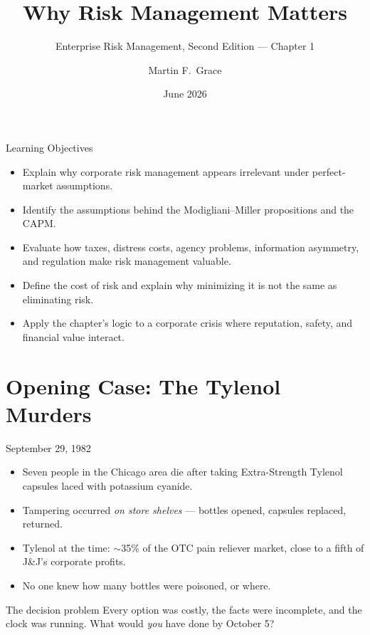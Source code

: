 \documentclass[11pt, aspectratio=169]{beamer}
\title[ERM Ch.\,1]{Why Risk Management Matters}
\subtitle{Enterprise Risk Management, Second Edition --- Chapter 1}
\author{Martin F.\ Grace}
\institute{University of Iowa\\[2pt] Tippie College of Business\\[2pt] Vaughan Institute of Risk Management}
\date{June 2026}
\begin{document}
\begin{frame}[plain]
\titlepage
\end{frame}

\begin{frame}{Learning Objectives}
\begin{itemize}
  \item Explain why corporate risk management appears \alert{irrelevant} under perfect-market assumptions.
  \item Identify the assumptions behind the Modigliani--Miller propositions and the CAPM.
  \item Evaluate how taxes, distress costs, agency problems, information asymmetry, and regulation make risk management valuable.
  \item Define the \alert{cost of risk} and explain why minimizing it is not the same as eliminating risk.
  \item Apply the chapter's logic to a corporate crisis where reputation, safety, and financial value interact.
\end{itemize}
\end{frame}

\section{Opening Case: The Tylenol Murders}

\begin{frame}{September 29, 1982}
\begin{itemize}
  \item Seven people in the Chicago area die after taking Extra-Strength Tylenol capsules laced with potassium cyanide.
  \item Tampering occurred \emph{on store shelves} --- bottles opened, capsules replaced, returned.
  \item Tylenol at the time: $\sim$35\% of the OTC pain reliever market, close to a fifth of J\&J's corporate profits.
  \item No one knew how many bottles were poisoned, or where.
\end{itemize}
\medskip
\begin{block}{The decision problem}
Every option was costly, the facts were incomplete, and the clock was running. What would \emph{you} have done by October 5?
\end{block}
\end{frame}
\end{document}
